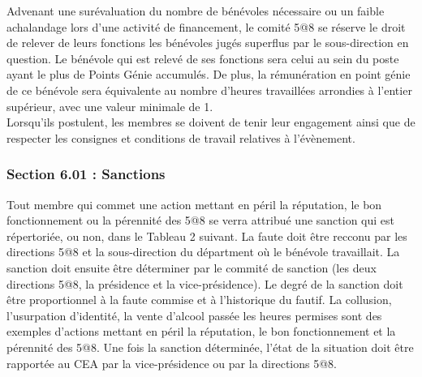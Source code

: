 Advenant une surévaluation du nombre de bénévoles nécessaire ou un faible achalandage lors d’une activité de financement, le comité 5@8 se réserve le droit de relever de leurs fonctions les bénévoles jugés superflus par le sous-direction en question. Le bénévole qui est relevé de ses fonctions sera celui au sein du poste ayant le plus de Points Génie accumulés. De plus, la rémunération en point génie de ce bénévole sera équivalente au nombre d’heures travaillées arrondies à l'entier supérieur, avec une valeur minimale de 1.\\

Lorsqu’ils postulent, les membres se doivent de tenir leur engagement ainsi que de respecter les consignes et conditions de travail relatives à l’évènement.

\subsubsection*{Section 6.01 : Sanctions}
Tout membre qui commet une action mettant en péril la réputation, le bon fonctionnement ou la pérennité des 5@8 se verra attribué une sanction qui est répertoriée, ou non, dans le Tableau 2 suivant. La faute doit être recconu par les directions 5@8 et la sous-direction du départment où le bénévole travaillait. La sanction doit ensuite être déterminer par le commité de sanction (les deux directions 5@8, la présidence et la vice-présidence).  Le degré de la sanction doit être proportionnel à la faute commise et à l’historique du fautif. La collusion, l’usurpation d’identité, la vente d’alcool passée les heures permises sont des exemples d’actions mettant en péril la réputation, le bon fonctionnement et la pérennité des 5@8. Une fois la sanction déterminée, l’état de la situation doit être rapportée au CEA par la vice-présidence ou par la directions 5@8.\\

